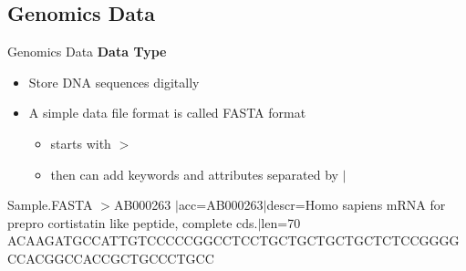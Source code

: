 \documentclass{beamer}
\begin{document}
    \subsection{Genomics Data}
    \begin{frame}{Genomics Data}
            \textbf{Data Type}
    \begin{itemize}
        \item Store DNA sequences digitally
        \item A simple data file format is called FASTA format
            \begin{itemize}
                \item starts with $>$
                \item then can add keywords and attributes separated by $|$
            \end{itemize}
    \end{itemize}
    
    \begin{block}{Sample.FASTA}
    $>$AB000263 $|$acc=AB000263$|$descr=Homo sapiens mRNA for prepro cortistatin like peptide, complete cds.$|$len=70
ACAAGATGCCATTGTCCCCCGGCCTCCTGCTGCTGCTGCTCTCCGGGGCCACGGCCACCGCTGCCCTGCC
    \end{block}
    
    \end{frame}
    
\end{document}
